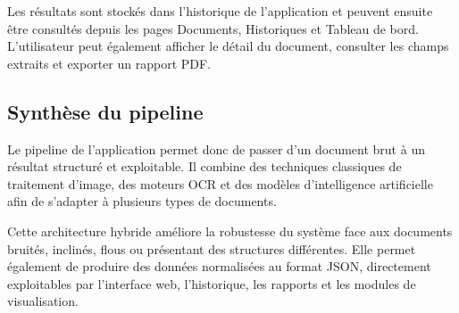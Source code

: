 Les résultats sont stockés dans l'historique de l'application et peuvent ensuite être consultés depuis les pages Documents, Historiques et Tableau de bord. L'utilisateur peut également afficher le détail du document, consulter les champs extraits et exporter un rapport PDF.

\subsection{Synthèse du pipeline}

Le pipeline de l'application permet donc de passer d'un document brut à un résultat structuré et exploitable. Il combine des techniques classiques de traitement d'image, des moteurs OCR et des modèles d'intelligence artificielle afin de s'adapter à plusieurs types de documents.

Cette architecture hybride améliore la robustesse du système face aux documents bruités, inclinés, flous ou présentant des structures différentes. Elle permet également de produire des données normalisées au format JSON, directement exploitables par l'interface web, l'historique, les rapports et les modules de visualisation.
